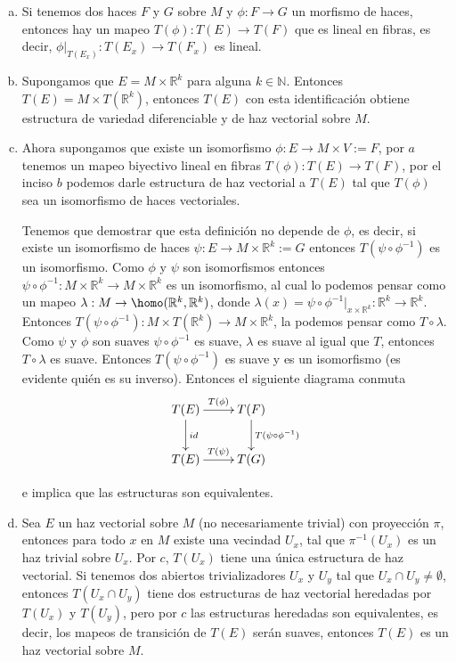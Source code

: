 \documentclass{report}
\theoremstyle{definition}
\let\hom\homo
\DeclareMathOperator{\hom}{Hom}
\begin{document}
\begin{enumerate}
\begin{enumerate}[a.]
\item Si tenemos dos haces $F$ y $G$ sobre $M$ y $\phi: F \to G$ un morfismo de haces, entonces hay un mapeo $T(\phi) : T(E) \to T(F)$ que es lineal en fibras, es decir, $\phi \vert_{T (E_x)} : T(E_x) \to T(F_x)$ es lineal.

\item Supongamos que $E = M \times \mathbb{R}^k$ para alguna $k \in \mathbb{N}$. Entonces $T(E) = M \times T(\mathbb{R}^k)$, entonces $T(E)$ con esta identificaci\'on obtiene estructura de variedad diferenciable y de haz vectorial sobre $M$.

\item Ahora supongamos que existe un isomorfismo $\phi: E \to M \times V := F$, por $a$ tenemos un mapeo biyectivo lineal en fibras $T(\phi): T(E) \to T(F)$, por el inciso $b$ podemos darle estructura de haz vectorial a $T(E)$ tal que $T(\phi)$ sea un isomorfismo de haces vectoriales.

Tenemos que demostrar que esta definici\'on no depende de $\phi$, es decir, si existe un isomorfismo de haces $\psi: E \to M \times \mathbb{R}^k := G$ entonces $T(\psi \circ \phi^{-1})$ es un isomorfismo. Como $\phi$ y $\psi$ son isomorfismos entonces $\psi \circ \phi^{-1}: M \times \mathbb{R}^k \to M \times \mathbb{R}^k$ es un isomorfismo, al cual lo podemos pensar como un mapeo $\lambda: M \to \hom(\mathbb{R}^k , \mathbb{R}^k)$, donde $\lambda (x) = \psi \circ \phi^{-1} \vert_{x \times \mathbb{R}^k} : \mathbb{R}^k \to \mathbb{R}^k$. Entonces $ T( \psi \circ \phi^{-1}): M \times T ( \mathbb{R}^k ) \to M \times \mathbb{R}^k$, la podemos pensar como $T \circ \lambda$. Como $\psi$ y $\phi$ son suaves $\psi \circ \phi^{-1}$ es suave, $\lambda$ es suave al igual que $T$, entonces $T \circ \lambda$ es suave. Entonces $ T (\psi \circ \phi^{-1} )$ es suave y es un isomorfismo (es evidente qui\'en es su inverso). Entonces el siguiente diagrama conmuta    $$\xymatrix{
T(E) \ar[d]^{id} \ar[r]^{T(\phi)} &T(F)\ar[d]^{T(\psi \circ \phi^{-1})}\\
T(E) \ar[r]^{T(\psi)} &T(G)} $$

e implica que las estructuras son equivalentes.

\item Sea $E$ un haz vectorial sobre $M$ (no necesariamente trivial) con proyecci\'on $\pi$, entonces para todo $x$ en $M$ existe una vecindad $U_x$, tal que $\pi^{-1} (U_x)$ es un haz trivial sobre $U_x$. Por $c$, $T(U_x)$ tiene una \'unica estructura de haz vectorial. Si tenemos dos abiertos trivializadores $U_x$ y $U_y$ tal que $U_x \cap U_y \neq \emptyset$, entonces $T(U_x \cap U_y)$ tiene dos estructuras de haz vectorial heredadas por $T(U_x)$ y $T(U_y)$, pero por $c$ las estructuras heredadas son equivalentes, es decir, los mapeos de transici\'on de $T(E)$ ser\'an suaves, entonces $T(E)$ es un haz vectorial sobre $M$.


\end{enumerate}
\end{enumerate}
\end{document}
